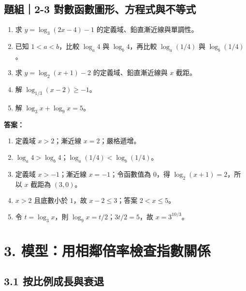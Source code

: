 \documentclass[11pt,a4paper]{article}
\providecommand{\tightlist}{%
  \setlength{\itemsep}{0pt}\setlength{\parskip}{0pt}}
\begin{document}
\begin{HandoutSelfCheck}

\subsection{題組｜2-3 對數函數圖形、方程式與不等式}\label{ux984cux7d442-3-ux5c0dux6578ux51fdux6578ux5716ux5f62ux65b9ux7a0bux5f0fux8207ux4e0dux7b49ux5f0f}

\begin{enumerate}
\def\labelenumi{\arabic{enumi}.}
\tightlist
\item
  求 \(y=\log_3(2x-4)-1\) 的定義域、鉛直漸近線與單調性。
\item
  已知 \(1<a<b\)，比較 \(\log_a4\) 與 \(\log_b4\)，再比較 \(\log_a(1/4)\) 與 \(\log_b(1/4)\)。
\item
  求 \(y=\log_2(x+1)-2\) 的定義域、鉛直漸近線與 \(x\) 截距。
\item
  解 \(\log_{1/3}(x-2)\ge-1\)。
\item
  解 \(\log_3x+\log_9x=5\)。
\end{enumerate}

\textbf{答案：}

\begin{enumerate}
\def\labelenumi{\arabic{enumi}.}
\tightlist
\item
  定義域 \(x>2\)；漸近線 \(x=2\)；嚴格遞增。
\item
  \(\log_a4>\log_b4\)；\(\log_a(1/4)<\log_b(1/4)\)。
\item
  定義域 \(x>-1\)；漸近線 \(x=-1\)；令函數值為 \(0\)，得 \(\log_2(x+1)=2\)，所以 \(x\) 截距為 \((3,0)\)。
\item
  \(x>2\) 且底數小於 \(1\)，故 \(x-2\le3\)；答案 \(2<x\le5\)。
\item
  令 \(t=\log_3x\)，則 \(\log_9x=t/2\)；\(3t/2=5\)，故 \(x=3^{10/3}\)。
\end{enumerate}

\end{HandoutSelfCheck}

\section{3. 模型：用相鄰倍率檢查指數關係}\label{ux6a21ux578bux7528ux76f8ux9130ux500dux7387ux6aa2ux67e5ux6307ux6578ux95dcux4fc2}

\subsection{3.1 按比例成長與衰退}\label{ux6309ux6bd4ux4f8bux6210ux9577ux8207ux8870ux9000}
\end{document}
